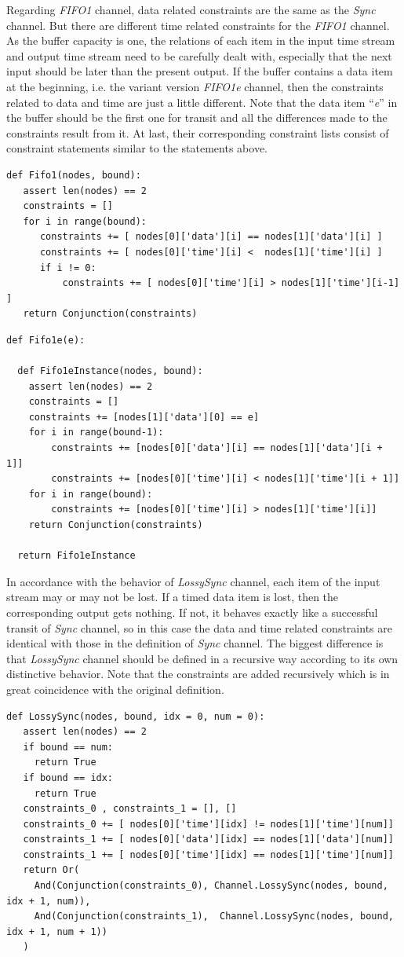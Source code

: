 \documentclass[preprint,3p]{elsarticle}
\begin{document}
Regarding \emph{FIFO1} channel, data related constraints are the same as the \emph{Sync} channel. But there are different time related constraints for the \emph{FIFO1} channel. As the buffer capacity is one, the relations of each item in the input time stream and output time stream need to be carefully dealt with, especially that the next input should be later than the present output. If the buffer contains a data item at the beginning, i.e. the variant version \emph{FIFO1e} channel, then the constraints related to data and time are just a little different. Note that the data item ``\emph{e}'' in the buffer should be the first one for transit and all the differences made to the constraints result from it. At last, their corresponding constraint lists consist of constraint statements similar to the statements above.
\begin{lstlisting}
def Fifo1(nodes, bound):
   assert len(nodes) == 2
   constraints = []
   for i in range(bound):
      constraints += [ nodes[0]['data'][i] == nodes[1]['data'][i] ]
      constraints += [ nodes[0]['time'][i] <  nodes[1]['time'][i] ]
      if i != 0:
          constraints += [ nodes[0]['time'][i] > nodes[1]['time'][i-1] ]
   return Conjunction(constraints)
\end{lstlisting}
\begin{lstlisting}
def Fifo1e(e):

  def Fifo1eInstance(nodes, bound):
    assert len(nodes) == 2
    constraints = []
    constraints += [nodes[1]['data'][0] == e]
    for i in range(bound-1):
        constraints += [nodes[0]['data'][i] == nodes[1]['data'][i + 1]]
        constraints += [nodes[0]['time'][i] < nodes[1]['time'][i + 1]]
    for i in range(bound):
        constraints += [nodes[0]['time'][i] > nodes[1]['time'][i]]
    return Conjunction(constraints)

  return Fifo1eInstance
\end{lstlisting}

In accordance with the behavior of \emph{LossySync} channel, each item of the input stream may or may not be lost. If a timed data item is lost, then the corresponding output gets nothing. If not, it behaves exactly like a successful transit of \emph{Sync} channel, so in this case the data and time related constraints are identical with those in the definition of \emph{Sync} channel. The biggest difference is that \emph{LossySync} channel should be defined in a recursive way according to its own distinctive behavior. Note that the constraints are added recursively which is in great coincidence with the original definition.
\begin{lstlisting}
def LossySync(nodes, bound, idx = 0, num = 0):
   assert len(nodes) == 2
   if bound == num:
     return True
   if bound == idx:
     return True
   constraints_0 , constraints_1 = [], []
   constraints_0 += [ nodes[0]['time'][idx] != nodes[1]['time'][num]]
   constraints_1 += [ nodes[0]['data'][idx] == nodes[1]['data'][num]]
   constraints_1 += [ nodes[0]['time'][idx] == nodes[1]['time'][num]]
   return Or(
     And(Conjunction(constraints_0), Channel.LossySync(nodes, bound, idx + 1, num)),
     And(Conjunction(constraints_1),  Channel.LossySync(nodes, bound, idx + 1, num + 1))
   )
\end{lstlisting}
\end{document}
